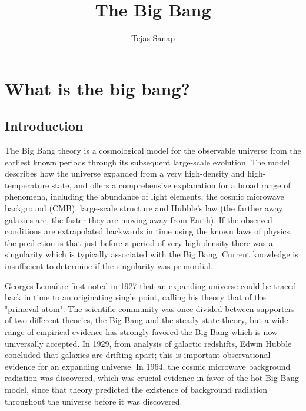 \documentclass[14pt, oneside]{book}
\title{\large The Big Bang}
\author{Tejas Sanap}
\begin{document}
\frontmatter
	\maketitle
	\tableofcontents
	\listoffigures

\mainmatter
	\chapter{What is the big bang?}
		\section{Introduction}
		The Big Bang theory is a cosmological model for the observable universe from the earliest known periods through its subsequent large-scale evolution\cite{2004biba.book.....S}. The model describes how the universe expanded from a very high-density and high-temperature state, and offers a comprehensive explanation for a broad range of phenomena, including the abundance of light elements, the cosmic microwave background (CMB), large-scale structure and Hubble's law (the farther away galaxies are, the faster they are moving away from Earth). If the observed conditions are extrapolated backwards in time using the known laws of physics, the prediction is that just before a period of very high density there was a singularity which is typically associated with the Big Bang. Current knowledge is insufficient to determine if the singularity was primordial.
		
		Georges Lemaître first noted in 1927 that an expanding universe could be traced back in time to an originating single point, calling his theory that of the "primeval atom". The scientific community was once divided between supporters of two different theories, the Big Bang and the steady state theory, but a wide range of empirical evidence has strongly favored the Big Bang which is now universally accepted\cite{kragh1999cosmology}. In 1929, from analysis of galactic redshifts, Edwin Hubble concluded that galaxies are drifting apart; this is important observational evidence for an expanding universe. In 1964, the cosmic microwave background radiation was discovered, which was crucial evidence in favor of the hot Big Bang model\cite{partridge20073k}, since that theory predicted the existence of background radiation throughout the universe before it was discovered.
		
\end{document}
